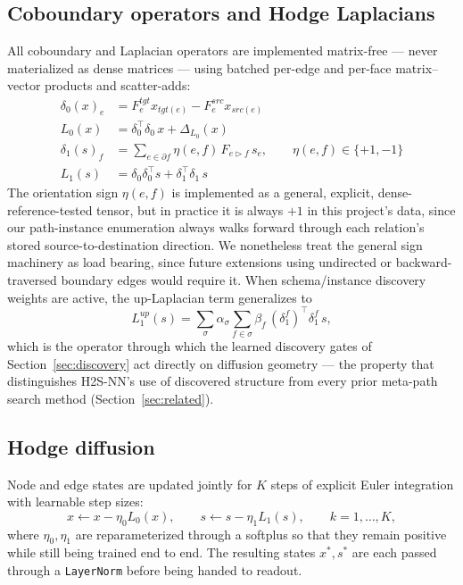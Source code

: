 \documentclass{article}
\begin{document}
\subsection{Coboundary operators and Hodge Laplacians}
\label{sec:diffusion}

All coboundary and Laplacian operators are implemented matrix-free --- never materialized as dense
matrices --- using batched per-edge and per-face matrix--vector products and scatter-adds:
\begin{align}
  \delta_0(x)_e &= F^{tgt}_e x_{tgt(e)} - F^{src}_e x_{src(e)} \\
  L_0(x) &= \delta_0^\top \delta_0\, x + \Delta_{L_0}(x) \\
  \delta_1(s)_f &= \sum_{e \in \partial f} \eta(e,f)\, F_{e\triangleright f}\, s_e, \qquad \eta(e,f)\in\{+1,-1\} \\
  L_1(s) &= \delta_0 \delta_0^\top s + \delta_1^\top \delta_1\, s
\end{align}
The orientation sign $\eta(e,f)$ is implemented as a general, explicit, dense-reference-tested
tensor, but in practice it is always $+1$ in this project's data, since our path-instance
enumeration always walks forward through each relation's stored source-to-destination direction. We
nonetheless treat the general sign machinery as load bearing, since future extensions using
undirected or backward-traversed boundary edges would require it. When schema/instance discovery
weights are active, the up-Laplacian term generalizes to
\begin{equation}
  L_1^{up}(s) = \sum_{\sigma} \alpha_\sigma \sum_{f \in \sigma} \beta_f\, (\delta_1^f)^\top \delta_1^f\, s,
  \label{eq:l1up}
\end{equation}
which is the operator through which the learned discovery gates of Section~\ref{sec:discovery} act
directly on diffusion geometry --- the property that distinguishes H2S-NN's use of discovered
structure from every prior meta-path search method (Section~\ref{sec:related}).

\subsection{Hodge diffusion}

Node and edge states are updated jointly for $K$ steps of explicit Euler integration with
learnable step sizes:
\begin{equation}
  x \leftarrow x - \eta_0 L_0(x), \qquad s \leftarrow s - \eta_1 L_1(s), \qquad k = 1,\dots,K,
\end{equation}
where $\eta_0,\eta_1$ are reparameterized through a softplus so that they remain positive while
still being trained end to end. The resulting states $x^*,s^*$ are each passed through a
\texttt{LayerNorm} before being handed to readout.
\end{document}
